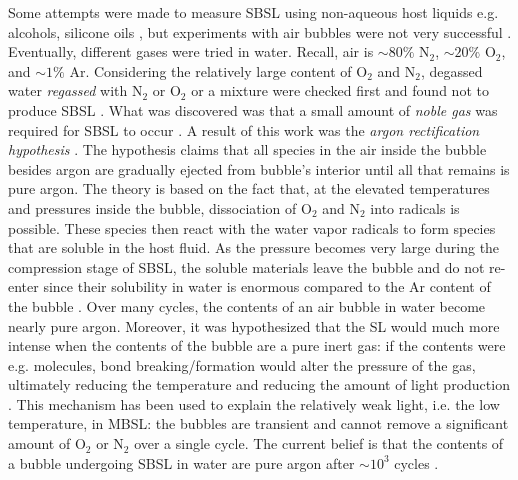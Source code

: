 \documentclass[rmp,aps,nofootinbib,superscriptaddress,floatfix]{revtex4-2}
\begin{document}
Some attempts were made to measure SBSL using non-aqueous host liquids e.g. alcohols, silicone oils \cite{weninger1995sonoluminescence,barber1997defining}, but experiments with air bubbles were not very successful \cite{barber1997defining}. Eventually, different gases were tried in water. Recall, air is $\sim 80\%$ N$_2$, $\sim 20\%$ O$_2$, and $\sim 1\% $ Ar. Considering the relatively large content of O$_2$ and N$_2$, degassed water \emph{regassed} with N$_2$ or O$_2$ or a mixture were checked first and found not to produce SBSL \cite{hiller1994effect}. What was discovered was that a small amount of \emph{noble gas} was required for SBSL to occur \cite{barber1997defining,hiller1994effect,brenner2002single}. A result of this work was the \emph{argon rectification hypothesis} \cite{lohse1997sonoluminescing,brenner2002single,yasui2018acoustic,suslick2008inside}. The hypothesis claims that all species in the air inside the bubble besides argon are gradually ejected from bubble's interior until all that remains is pure argon. The theory is based on the fact that, at the elevated temperatures and pressures inside the bubble, dissociation of O$_2$ and N$_2$ into radicals is possible. These species then react with the water vapor radicals to form species that are soluble in the host fluid. As the pressure becomes very large during the compression stage of SBSL, the soluble materials leave the bubble and do not re-enter since their solubility in water is enormous compared to the Ar content of the bubble \cite{lohse1997sonoluminescing}. Over many cycles, the contents of an air bubble in water become nearly pure argon. Moreover, it was hypothesized that the SL would much more intense when the contents of the bubble are a pure inert gas: if the contents were e.g. molecules, bond breaking/formation would alter the pressure of the gas, ultimately reducing the temperature and reducing the amount of light production \cite{brenner2002single,yasui2018acoustic,lohse2018bubble,suslick2008inside}. This mechanism has been used to explain the relatively weak light, i.e. the low temperature, in MBSL: the bubbles are transient and cannot remove a significant amount of O$_2$ or N$_2$ over a single cycle. The current belief is that the contents of a bubble undergoing SBSL in water are pure argon after $\sim 10^3$ cycles \cite{brenner2002single,yasui2018acoustic}. 
\end{document}
